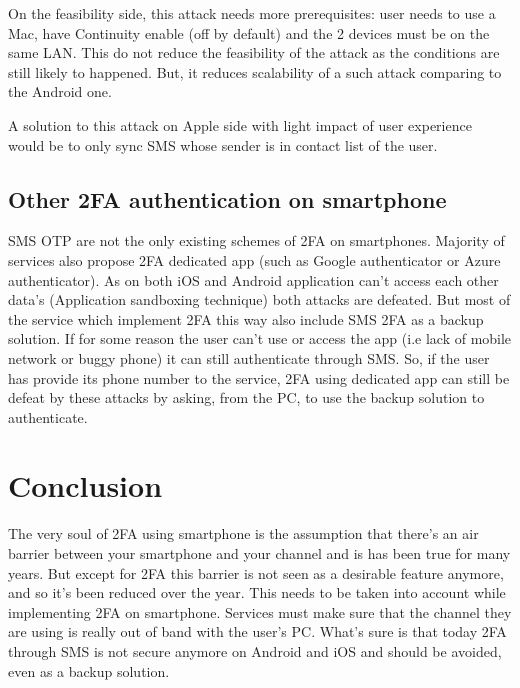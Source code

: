 \documentclass[11pt, a4paper,twocolumn]{article}
\begin{document}
On the feasibility side, this attack needs more prerequisites: user needs to use a Mac, have Continuity enable (off by default) and the 2 devices must be on the same LAN. This do not reduce the feasibility of the attack as the conditions are still likely to happened. But, it reduces scalability of a such attack comparing to the Android one.

A solution to this attack on Apple side with light impact of user experience would be to only sync SMS whose sender is in contact list of the user.

\subsection{Other 2FA authentication on smartphone}
SMS OTP are not the only existing schemes of 2FA on smartphones. Majority of services also propose 2FA dedicated app (such as Google authenticator or Azure authenticator). As on both iOS and Android application can't access each other data's (Application sandboxing technique) both attacks are defeated. But most of the service which implement 2FA this way also include SMS 2FA as a backup solution. If for some reason the user can't use or access the app (i.e lack of mobile network or buggy phone) it can still authenticate through SMS. So, if the user has provide its phone number to the service, 2FA using dedicated app can still be defeat by these attacks by asking, from the PC, to use the backup solution to authenticate.


\section{Conclusion}

The very soul of 2FA using smartphone is the assumption that there's an air barrier between your smartphone and your channel and is has been true for many years. But except for 2FA this barrier is not seen as a desirable feature anymore, and so it's been reduced over the year. This needs to be taken into account while implementing 2FA on smartphone. Services must make sure that the channel they are using is really out of band with the user's PC. What's sure is that today 2FA through SMS is not secure anymore on Android and iOS and should be avoided, even as a backup solution.

\clearpage
% 
%
\printbibliography
\end{document}
